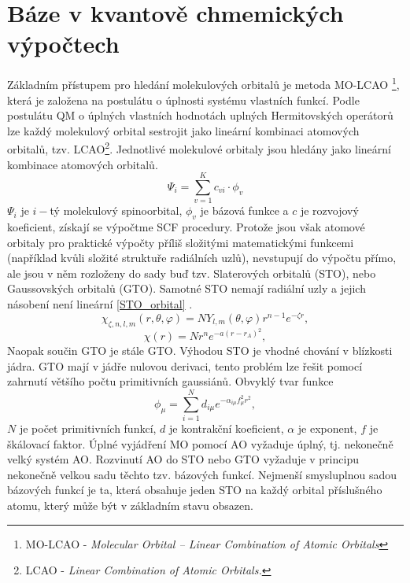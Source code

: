 \documentclass[
  digital, %
  table,   %
  lof,     %
  lot,     %
  oneside,
]{fithesis3}
\begin{document}
\section{Báze v kvantově chmemických výpočtech}
Základním přístupem pro hledání molekulových orbitalů je metoda MO-LCAO \footnote{MO-LCAO - \textit{Molecular Orbital – Linear Combination of Atomic Orbitals}}, která je založena na postulátu o úplnosti systému vlastních funkcí. Podle postulátu QM o úplných vlastních hodnotách uplných Hermitovských operátorů lze každý molekulový orbital sestrojit jako lineární kombinaci atomových orbitalů, tzv. LCAO\footnote{LCAO - \textit{Linear Combination of Atomic Orbitals.}}. Jednotlivé molekulové orbitaly jsou hledány jako lineární kombinace atomových orbitalů.
\begin{equation}
\Psi_i = \sum_{v=1}^{K}c_{vi} \cdot \phi_{v}
\end{equation}
$\Psi_i$ je $i-$tý molekulový spinoorbital, $\phi_{v}$ je bázová funkce a $c$ je rozvojový koeficient, získají se výpočtme SCF procedury. Protože jsou však atomové orbitaly pro praktické výpočty příliš složitými matematickými funkcemi (například kvůli složité struktuře radiálních uzlů), nevstupují do výpočtu přímo, ale jsou v něm rozloženy do sady buď tzv. Slaterových orbitalů (STO), nebo Gaussovských orbitalů (GTO). Samotné STO nemají radiální uzly a jejich násobení není lineární \ref{STO_orbital} \cite{jensen2007introduction}.
\begin{equation}
\chi_{\zeta, n, l, m}(r, \theta, \varphi) = NY_{l,m} (\theta, \varphi) r^{n-1} e^{-\zeta r},
\label{STO_orbital}
\end{equation}
\begin{equation}
\chi(r) = Nr^n e^{-a(r-r_A)^2},
\end{equation}
 Naopak součin GTO je stále GTO. Výhodou STO je vhodné chování v blízkosti jádra. GTO mají v jádře nulovou derivaci, tento problém lze řešit pomocí zahrnutí většího počtu primitivních gaussiánů. Obvyklý tvar funkce
\begin{equation}
\phi_\mu = \sum_{i=1}^{N}d_{i\mu}e^{-\alpha_{i\mu}f^2_{\mu}r^2},
\end{equation}
$N$ je počet primitivních funkcí, $d$ je kontrakční koeficient, $\alpha$ je exponent, $f$ je škálovací faktor. Úplné vyjádření MO pomocí AO vyžaduje úplný, tj. nekonečně velký systém AO. Rozvinutí AO do STO nebo GTO vyžaduje v principu nekonečně velkou sadu těchto tzv. bázových funkcí. Nejmenší smysluplnou sadou bázových funkcí je ta, která obsahuje jeden STO na každý orbital příslušného atomu, který může být v základním stavu obsazen.
\end{document}

